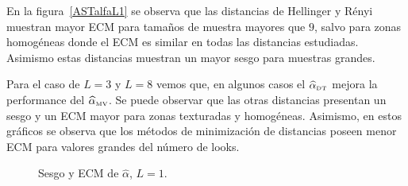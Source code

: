 En la figura~\ref{ASTalfaL1} se observa que las distancias de Hellinger y Rényi muestran mayor ECM para tamaños de muestra mayores que $9$, salvo para zonas homogéneas donde el ECM es similar en todas las distancias estudiadas. Asimismo estas distancias muestran un mayor sesgo para muestras grandes.

Para el caso de $L=3$ y $L=8$ vemos que, en algunos casos el $\widehat{\alpha}_{\text{\tiny{DT}}}$ mejora la performance del $\widehat{\alpha}_{\text{\tiny{MV}}}$. Se puede observar que las otras distancias presentan un sesgo y un ECM mayor para zonas texturadas y homogéneas. Asimismo, en estos gráficos se observa que los métodos de minimización de distancias poseen menor ECM para valores grandes del número de looks. 

\begin{figure}[htb]
	\centering    
	\caption{\label{ASTL1} \small Sesgo y ECM de $\widehat{\alpha}$, $L=1$.}
\end{figure}	
